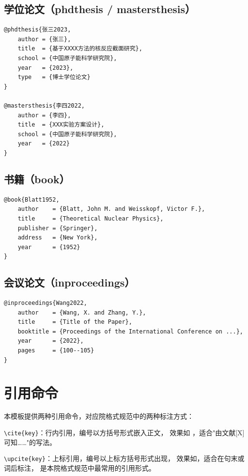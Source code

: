 \subsection{学位论文（phdthesis / mastersthesis）}

\begin{verbatim}
@phdthesis{张三2023,
    author = {张三},
    title  = {基于XXXX方法的核反应截面研究},
    school = {中国原子能科学研究院},
    year   = {2023},
    type   = {博士学位论文}
}

@mastersthesis{李四2022,
    author = {李四},
    title  = {XXX实验方案设计},
    school = {中国原子能科学研究院},
    year   = {2022}
}
\end{verbatim}

\subsection{书籍（book）}

\begin{verbatim}
@book{Blatt1952,
    author    = {Blatt, John M. and Weisskopf, Victor F.},
    title     = {Theoretical Nuclear Physics},
    publisher = {Springer},
    address   = {New York},
    year      = {1952}
}
\end{verbatim}

\subsection{会议论文（inproceedings）}

\begin{verbatim}
@inproceedings{Wang2022,
    author    = {Wang, X. and Zhang, Y.},
    title     = {Title of the Paper},
    booktitle = {Proceedings of the International Conference on ...},
    year      = {2022},
    pages     = {100--105}
}
\end{verbatim}

\section{引用命令}

本模板提供两种引用命令，对应院格式规范中的两种标注方式：

\begin{compactitem}
    \item \verb|\cite{key}|：行内引用，编号以方括号形式嵌入正文，
          效果如 \cite{KIBEDI200235}，适合"由文献[X]可知……"的写法。
    \item \verb|\upcite{key}|：上标引用，编号以上标方括号形式出现，
          效果如，适合在句末或词后标注，
          是本院格式规范中最常用的引用形式。
\end{compactitem}

